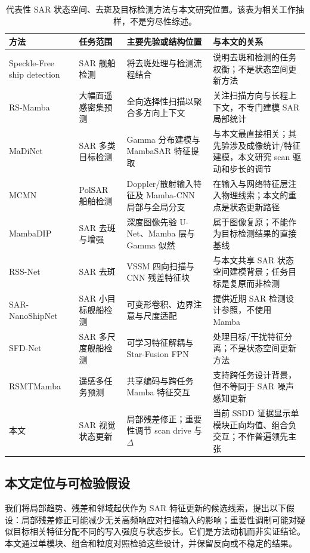 \documentclass[UTF8,12pt,a4paper]{ctexart}
\begin{document}
\begin{table}[H]\centering\scriptsize
\caption{代表性 SAR 状态空间、去斑及目标检测方法与本文研究位置。该表为相关工作抽样，不是穷尽性综述。}
\label{tab:related_position}
\begin{tabularx}{\linewidth}{p{3.2cm}p{2.25cm}p{3.7cm}X}
\toprule
方法 & 任务范围 & 主要先验或结构位置 & 与本文的关系\\
\midrule
Speckle-Free ship detection\cite{specklefree} & SAR 舰船检测 & 将去斑处理与检测流程结合 & 说明去斑和检测的任务权衡；不是状态空间更新方法\\
RS-Mamba\cite{rsmamba2024} & 大幅面遥感密集预测 & 全向选择性扫描以聚合多方向上下文 & 关注扫描方向与长程上下文，不专门建模 SAR 局部统计\\
MaDiNet\cite{madinet2025} & SAR 多类目标检测 & Gamma 分布建模与 MambaSAR 特征提取 & 与本文最直接相关；其先验涉及成像统计/特征建模，本文研究 scan 驱动和步长的调节\\
MCMN\cite{mcmn} & PolSAR 船舶检测 & Doppler/散射输入特征及 Mamba-CNN 局部与全局分支 & 在输入与网络特征层注入物理线索；本文的重点是状态更新路径\\
MambaDIP\cite{mambadip} & SAR 去斑与增强 & 深度图像先验 U-Net、Mamba 层与 Gamma 似然 & 属于图像复原；不能作为目标检测结果的直接基线\\
RSS-Net\cite{rssnet} & SAR 去斑 & VSSM 四向扫描与 CNN 残差特征块 & 与本文共享 SAR 状态空间建模背景；任务目标是复原而非检测\\
SAR-NanoShipNet\cite{sarnano} & SAR 小目标舰船检测 & 可变形卷积、边界注意与尺度适配 & 提供近期 SAR 检测设计参照，不使用 Mamba\\
SFD-Net\cite{sfdnet} & SAR 多尺度舰船检测 & 可学习特征解耦与 Star-Fusion FPN & 处理目标/干扰特征分离；不是状态空间更新方法\\
RSMTMamba\cite{rstmtmamba2025} & 遥感多任务预测 & 共享编码与跨任务 Mamba 特征交互 & 支持跨任务设计背景，但不等同于 SAR 噪声感知更新\\
本文 & SAR 视觉状态更新 & 局部残差修正；重要性调节 scan drive 与 $\Delta$ & 当前 SSDD 证据显示单模块正向均值、组合负交互；不作普遍领先主张\\
\bottomrule
\end{tabularx}
\end{table}

\subsection{本文定位与可检验假设}
我们将局部趋势、残差和邻域起伏作为 SAR 特征更新的候选线索，提出以下假设：局部残差修正可能减少无关高频响应对扫描输入的影响；重要性调制可能对疑似目标相关特征分配不同的写入强度与状态步长。它们是方法动机而非实证结论。本文通过单模块、组合和粒度对照检验这些设计，并保留反向或不稳定的结果。
\end{document}
